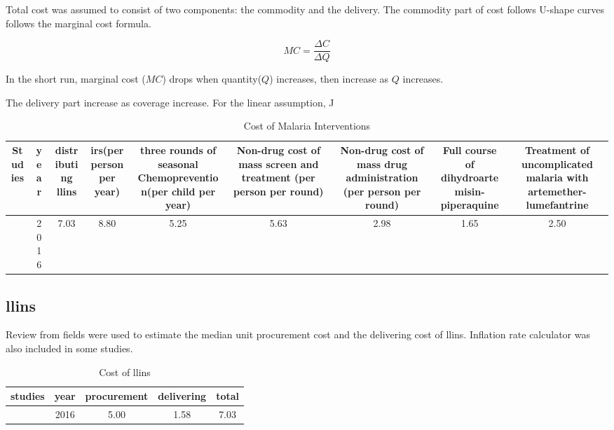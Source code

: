 \documentclass[a4paper, 12pt, twoside]{article}
\begin{document}
Total cost was assumed to consist of two components: the commodity and the delivery. The commodity part of cost follows U-shape curves follows the marginal cost formula.

$$ MC = \frac{\Delta C}{\Delta Q} $$

In the short run, marginal cost ($MC$) drops when quantity($Q$) increases, then increase as $Q$ increases.

The delivery part increase as coverage increase. For the linear assumption, J

\begin{table}[htpb]
	\centering
	\caption{Cost of Malaria Interventions}
	\label{tab:cost_of_malaria_interventions}
	{\small
		\begin{tabular}{cSSSSSSSS}
			\toprule
			Studies           & {year} & {distributing \gls{llins}} & {\gls{irs}(per person per year)} & {three rounds of seasonal Chemoprevention(per child per year) } & {Non-drug cost of mass screen and treatment (per person per round)} & {Non-drug cost of mass drug administration (per person per round) } & {Full course of dihydroartemisin-piperaquine} & {Treatment of uncomplicated malaria with artemether-lumefantrine} \\
			\midrule
			\cite{Walker2016} & 2016   & 7.03                       & 8.80                             & 5.25                                                            & 5.63                                                                & 2.98                                                                & 1.65                                          & 2.50                                                              \\
			\bottomrule
		\end{tabular}
	}
\end{table}

\subsection{\texorpdfstring{\gls{llins}}{LLINs}}
Review from fields were used to estimate the median unit procurement cost and the delivering cost of \gls{llins}.
Inflation rate calculator was also included in some studies\cite{Walker2016}.

\begin{table}[htpb]
	\centering
	\caption{Cost of \gls{llins}}
	\label{tab:cost_of_llins}
	\begin{tabular}{cSSSS}
		\toprule
		studies           & {year} & {procurement} & {delivering} & {total} \\
		\midrule
		\cite{Walker2016} & 2016   & 5.00          & 1.58         & 7.03    \\
		\bottomrule
	\end{tabular}
\end{table}
\end{document}
